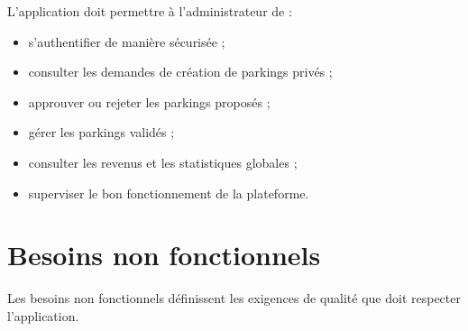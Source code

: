 \par L'application doit permettre à l'administrateur de :

\begin{itemize}
    \item s'authentifier de manière sécurisée ;
    \item consulter les demandes de création de parkings privés ;
    \item approuver ou rejeter les parkings proposés ;
    \item gérer les parkings validés ;
    \item consulter les revenus et les statistiques globales ;
    \item superviser le bon fonctionnement de la plateforme.
\end{itemize}
\section{Besoins non fonctionnels}

\par Les besoins non fonctionnels définissent les exigences de qualité que doit respecter l'application.

